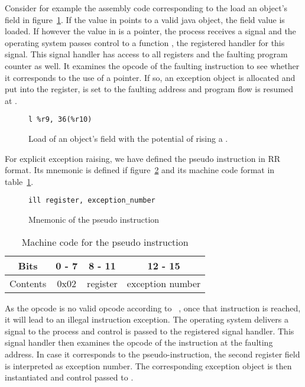 Consider for example the assembly code corresponding to the load an object's field in figure~\ref{s390:fig:exceptionrise}. If the value in  points to a valid java object, the field value is loaded. If however the value in  is a  pointer, the process receives a  signal and the operating system passes control to a function , the registered handler for this signal. This signal handler has access to all registers and the faulting program counter as well. It examines the opcode of the faulting instruction to see whether it corresponds to the use of a  pointer. If so, an exception object is allocated and put into the  register,  is set to the faulting address and program flow is resumed at . 

\begin{figure}[H]
\begin{verbatim}
l %r9, 36(%r10)
\end{verbatim}
\caption{Load of an object's field with the potential of rising a .}
\label{s390:fig:exceptionrise}
\end{figure}

For explicit exception raising, we have defined the  pseudo instruction in RR format. Its mnemonic is defined if figure~\ref{s390:fig:ill} and its machine code format in table~\ref{s390:tbl:ill}.

\begin{figure}
\centering
\begin{verbatim}
ill register, exception_number
\end{verbatim}
\caption{Mnemonic of the  pseudo instruction}
\label{s390:fig:ill}
\end{figure}

\begin{table}
\centering
\begin{tabular}{|c|c|c|c|}
	\hline
	Bits & 0 - 7 & 8 - 11 & 12 - 15 \\
	\hline
	Contents & 0x02 & register & exception number \\
	\hline
\end{tabular}
\caption{Machine code for the  pseudo instruction}
\label{s390:tbl:ill}
\end{table}

As the opcode  is no valid opcode according to~\cite{s390:bib:principles} , once that instruction is reached, it will lead to an illegal instruction exception. The operating system delivers a  signal to the process and control is passed to the registered signal handler. This signal handler then examines the opcode of the instruction at the faulting address. In case it corresponds to the  pseudo-instruction, the second register field is interpreted as exception number. The corresponding exception object is then instantiated and control passed to .

